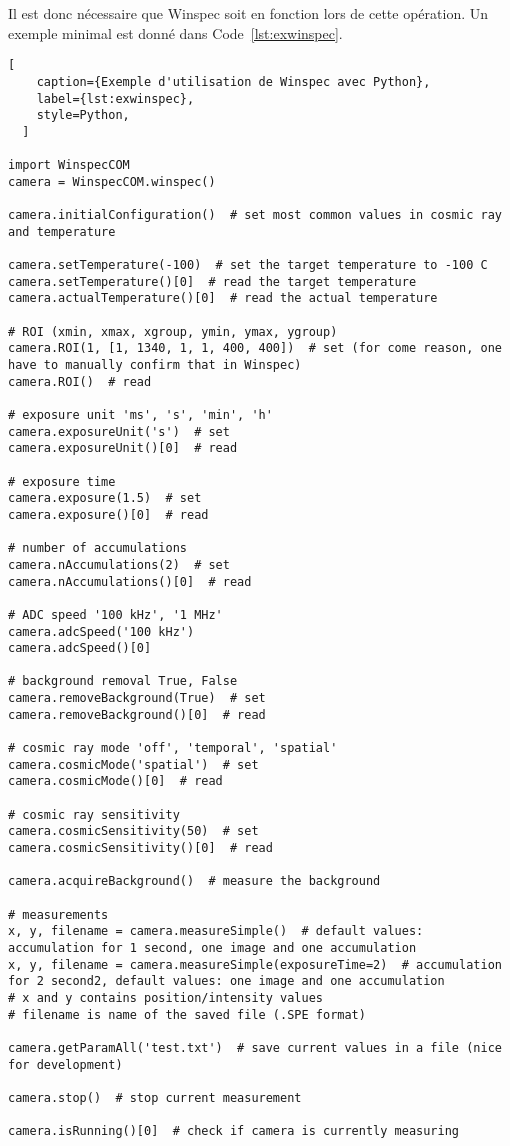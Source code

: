 \documentclass[11pt,francais]{book} %
\begin{document}
Il est donc nécessaire que Winspec soit en fonction lors de cette opération.
Un exemple minimal est donné dans Code~\ref{lst:exwinspec}.

\begin{lstlisting}[
    caption={Exemple d'utilisation de Winspec avec Python},
    label={lst:exwinspec},
    style=Python,
  ]  

import WinspecCOM
camera = WinspecCOM.winspec()

camera.initialConfiguration()  # set most common values in cosmic ray and temperature

camera.setTemperature(-100)  # set the target temperature to -100 C
camera.setTemperature()[0]  # read the target temperature
camera.actualTemperature()[0]  # read the actual temperature

# ROI (xmin, xmax, xgroup, ymin, ymax, ygroup)
camera.ROI(1, [1, 1340, 1, 1, 400, 400])  # set (for come reason, one have to manually confirm that in Winspec)
camera.ROI()  # read

# exposure unit 'ms', 's', 'min', 'h'
camera.exposureUnit('s')  # set
camera.exposureUnit()[0]  # read

# exposure time 
camera.exposure(1.5)  # set
camera.exposure()[0]  # read

# number of accumulations
camera.nAccumulations(2)  # set
camera.nAccumulations()[0]  # read

# ADC speed '100 kHz', '1 MHz'
camera.adcSpeed('100 kHz')
camera.adcSpeed()[0]

# background removal True, False
camera.removeBackground(True)  # set
camera.removeBackground()[0]  # read

# cosmic ray mode 'off', 'temporal', 'spatial'
camera.cosmicMode('spatial')  # set
camera.cosmicMode()[0]  # read

# cosmic ray sensitivity
camera.cosmicSensitivity(50)  # set
camera.cosmicSensitivity()[0]  # read

camera.acquireBackground()  # measure the background

# measurements
x, y, filename = camera.measureSimple()  # default values: accumulation for 1 second, one image and one accumulation
x, y, filename = camera.measureSimple(exposureTime=2)  # accumulation for 2 second2, default values: one image and one accumulation
# x and y contains position/intensity values
# filename is name of the saved file (.SPE format)

camera.getParamAll('test.txt')  # save current values in a file (nice for development)

camera.stop()  # stop current measurement

camera.isRunning()[0]  # check if camera is currently measuring
\end{lstlisting}
\end{document}
